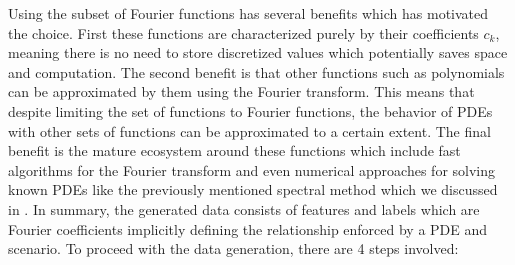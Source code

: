 Using the subset of Fourier functions has several benefits which has motivated the choice. First these functions are characterized purely by their coefficients \(c_k\), meaning there is no need to store discretized values which potentially saves space and computation. The second benefit is that other functions such as polynomials can be approximated by them using the Fourier transform. This means that despite limiting the set of functions to Fourier functions, the behavior of PDEs with other sets of functions can be approximated to a certain extent. The final benefit is the mature ecosystem around these functions which include fast algorithms for the Fourier transform and even numerical approaches for solving known PDEs like the previously mentioned spectral method which we discussed in . In summary, the generated data consists of features and labels which are Fourier coefficients implicitly defining the relationship enforced by a PDE and scenario. To proceed with the data generation, there are 4 steps involved:
